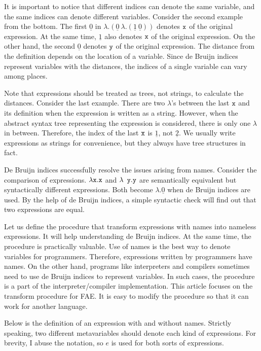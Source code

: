 It is important to notice that different indices can denote the same variable,
and the same indices can denote different variables. Consider the second example
from the bottom. The first $\underline{0}$ in $\lambda.(\underline{0}\
\lambda.(\underline{1}\ \underline{0}))$ denotes $\texttt{x}$ of the original
expression. At the same time, $\underline{1}$ also denotes $\texttt{x}$ of the
original expression. On the other hand, the second $\underline{0}$ denotes
$\texttt{y}$ of the original expression. The distance from the definition depends on the
location of a variable. Since de Bruijn indices represent variables with the
distances, the indices of a single variable can vary among places.

Note that expressions should be treated as trees, not strings, to calculate the
distances. Consider the last example. There are two $\lambda$’s between the last
$\texttt{x}$ and its definition when the expression is written as a string. However,
when the abstract syntax tree representing the expression is considered, there is
only one $\lambda$ in between. Therefore, the index of the last $\texttt{x}$ is
$\underline{1}$, not $\underline{2}$. We usually write expressions as strings for
convenience, but they always have tree structures in fact.

De Bruijn indices successfully resolve the issues arising from names. Consider
the comparison of expressions. $\lambda \texttt{x}.\texttt{x}$ and $\lambda \texttt{
y}.\texttt{y}$ are semantically equivalent but syntactically different expressions.
Both become $\lambda.\underline{0}$ when de Bruijn indices are used. By the help
of de Bruijn indices, a simple syntactic check will find out that two expressions
are equal.

Let us define the procedure that transform expressions with names into nameless
expressions. It will help understanding de Bruijn indices. At the same time, the
procedure is practically valuable. Use of names is the best way to denote
variables for programmers. Therefore, expressions written by programmers have
names. On the other hand, programs like interpreters and compilers sometimes need
to use de Bruijn indices to represent variables. In such cases, the procedure is
a part of the interpreter/compiler implementation. This article focuses on the
transform procedure for FAE. It is easy to modify the procedure so that it can
work for another language.

Below is the definition of an expression with and without names. Strictly
speaking, two different metavariables should denote each kind of expressions. For
brevity, I abuse the notation, so $e$ is used for both sorts of expressions.

